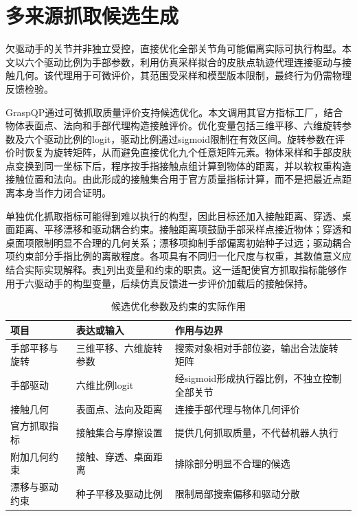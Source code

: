\section{多来源抓取候选生成}
\label{sec:grasp_candidate_generation}

欠驱动手的关节并非独立受控，直接优化全部关节角可能偏离实际可执行构型。本文以六个驱动比例为手部参数，利用仿真采样拟合的皮肤点轨迹代理连接驱动与接触几何。该代理用于可微评价，其范围受采样和模型版本限制，最终行为仍需物理反馈检验。

GraspQP通过可微抓取质量评价支持候选优化\cite{zurbrugg2025graspqp}。本文调用其官方指标工厂，结合物体表面点、法向和手部代理构造接触评价。优化变量包括三维平移、六维旋转参数及六个驱动比例的logit，驱动比例通过sigmoid限制在有效区间。旋转参数在评价时恢复为旋转矩阵，从而避免直接优化九个任意矩阵元素。物体采样和手部皮肤点变换到同一坐标下后，程序按手指接触点组计算到物体的距离，并以软权重构造接触位置和法向。由此形成的接触集合用于官方质量指标计算，而不是把最近点距离本身当作力闭合证明。

单独优化抓取指标可能得到难以执行的构型，因此目标还加入接触距离、穿透、桌面距离、平移漂移和驱动耦合约束。接触距离项鼓励手部采样点接近物体；穿透和桌面项限制明显不合理的几何关系；漂移项抑制手部偏离初始种子过远；驱动耦合项约束部分手指比例的离散程度。各项具有不同归一化尺度与权重，其数值意义应结合实际实现解释。表\ref{tab:ch03_candidate_parameters}列出变量和约束的职责。这一适配使官方抓取指标能够作用于六驱动手的构型变量，后续仿真反馈进一步评价加载后的接触保持。

\begin{table}[htbp]
 \centering\small
 \caption{候选优化参数及约束的实际作用}
 \label{tab:ch03_candidate_parameters}
 \begin{tabular}{p{}p{}p{}}
 \hline
 项目 & 表达或输入 & 作用与边界\\
 \hline
 手部平移与旋转 & 三维平移、六维旋转参数 & 搜索对象相对手部位姿，输出合法旋转矩阵\\
 手部驱动 & 六维比例logit & 经sigmoid形成执行器比例，不独立控制全部关节\\
 接触几何 & 表面点、法向及距离 & 连接手部代理与物体几何评价\\
 官方抓取指标 & 接触集合与摩擦设置 & 提供几何抓取质量，不代替机器人执行\\
 附加几何约束 & 接触、穿透、桌面距离 & 排除部分明显不合理的候选\\
 漂移与驱动约束 & 种子平移及驱动比例 & 限制局部搜索偏移和驱动分散\\
 \hline
 \end{tabular}
\end{table}

